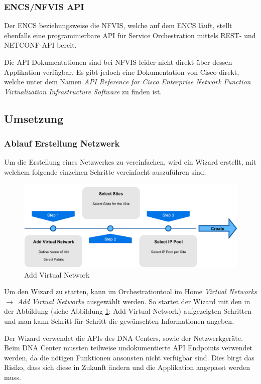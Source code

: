 \subsubsection{ENCS/NFVIS API}
Der ENCS beziehungsweise die NFVIS, welche auf dem ENCS läuft, stellt ebenfalls eine programmierbare API für Service Orchestration mittels REST- und NETCONF-API bereit. 

Die API Dokumentationen sind bei NFVIS leider nicht direkt über dessen Applikation verfügbar. Es gibt jedoch eine Dokumentation von Cisco direkt, welche unter dem Namen \textit{API Reference for Cisco Enterprise Network Function Virtualization Infrastructure Software} \cite{nfvis-api} zu finden ist.


\subsection{Umsetzung}

\subsubsection{Ablauf Erstellung Netzwerk}
Um die Erstellung eines Netzwerkes zu vereinfachen, wird ein Wizard erstellt, mit welchem folgende einzelnen Schritte vereinfacht auszuführen sind. 

\begin{figure}[H]
	\centering
	\includegraphics[width=0.8\linewidth]{img/Abstrahierung/addvirtualnetwork}
	\caption{Add Virtual Network}
	\label{fig:Add Virtual Network}
\end{figure}

Um den Wizard zu starten, kann im Orchestrationtool im Home \textit{Virtual Networks $\rightarrow$ Add Virtual Networks} ausgewählt werden. So startet der Wizard mit den in der Abbildung (siehe Abbildung \ref{fig:Add Virtual Network}: Add Virtual Network) aufgezeigten Schritten und man kann Schritt für Schritt die gewünschten Informationen angeben.

Der Wizard verwendet die APIs des DNA Centers, sowie der Netzwerkgeräte. Beim DNA Center mussten teilweise undokumentierte API Endpoints verwendet werden, da die nötigen Funktionen ansonsten nicht verfügbar sind. Dies birgt das Risiko, dass sich diese in Zukunft ändern und die Applikation angepasst werden muss.


